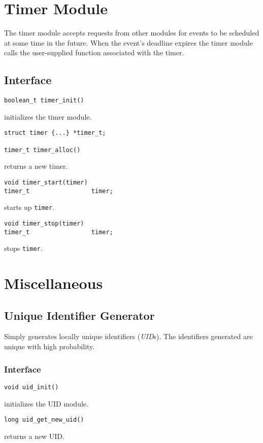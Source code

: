 \section{Timer Module}
The timer module accepts requests from other modules for events to be
scheduled at some time in the future.  When the event's deadline expires the
timer module calls the user-supplied function associated with the timer.

\subsection{Interface}
\begin{verbatim}
boolean_t timer_init()
\end{verbatim}
initializes the timer module.

\begin{verbatim}
struct timer {...} *timer_t;

timer_t timer_alloc()
\end{verbatim}
returns a new timer.

\begin{verbatim}
void timer_start(timer)
timer_t                 timer;
\end{verbatim}
starts up \verb"timer".

\begin{verbatim}
void timer_stop(timer)
timer_t                 timer;
\end{verbatim}
stops \verb"timer".

\section{Miscellaneous}
\subsection{Unique Identifier Generator}
Simply generates locally unique identifiers ({\it UID\/}s).
The identifiers generated are unique with high probability.

\subsubsection{Interface}
\begin{verbatim}
void uid_init()
\end{verbatim}
initializes the UID module.

\begin{verbatim}
long uid_get_new_uid()
\end{verbatim}
returns a new UID.

